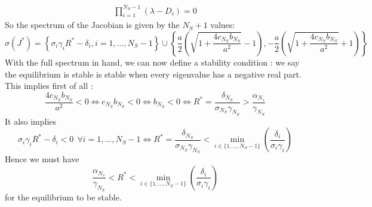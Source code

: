 \documentclass[12pt]{article}
\begin{document}
\begin{appendices}
\begin{align}
			\prod_{i=1}^{N_S-1}\left(\lambda-D_i\right) =0
	\end{align}
	So the spectrum of the Jacobian is given by the $N_S+1$ values:
	\begin{equation}
		\sigma(J^*) = \left\{\sigma_i \gamma_i R^*-\delta_i, i=1,..., N_S-1\right\} \cup \left\{\frac{a}{2}\left(\sqrt{1+\frac{4c_{N_S} b_{N_S}}{a^2}}-1\right), -\frac{a}{2}\left(\sqrt{1+\frac{4c_{N_S} b_{N_S}}{a^2}}+1\right)\right\}
	\end{equation}
	With the full spectrum in hand, we can now define a stability condition : we say the equilibrium is stable is stable when every eigenvalue has a negative real part.
	This implies first of all :
	\begin{equation}
		\frac{4 c_{N_S} b_{N_S}}{a^2} < 0 \iff c_{N_S} b_{N_S} < 0 \iff b_{N_S} < 0 \iff R^* = \frac{\delta_{N_S}}{\sigma_{N_S}\gamma_{N_S}} > \frac{\alpha_{N_s}}{\gamma_{N_S}}
	\end{equation}
	It also implies 
	\begin{equation}
		\sigma_i \gamma_i R^* - \delta_i < 0 \ \ \forall i = 1, \dots, N_S-1 \iff R^* = \frac{\delta_{N_S}}{\sigma_{N_S}\gamma_{N_S}} < \min_{i \in \{1, \dots, N_S-1\}}\left(\frac{\delta_i}{\sigma_i \gamma_{i}} \right)
	\end{equation}
	Hence we must have
	\begin{equation}
		\boxed{ \frac{\alpha_{N_s}}{\gamma_{N_S}} < R^* < \min_{i \in \{1, \dots, N_S-1\}}\left(\frac{\delta_i}{\sigma_i \gamma_{i}}\right)}
	\end{equation}
	for the equilibrium to be stable.



\end{appendices}
\end{document}
